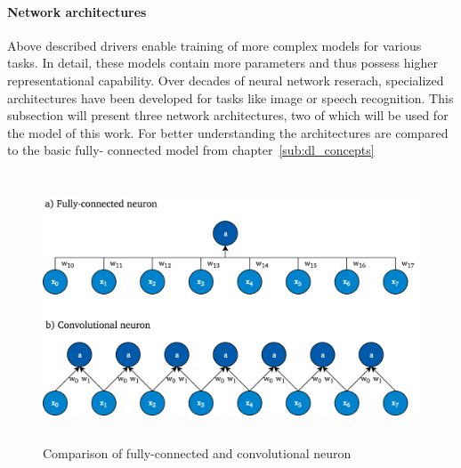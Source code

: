 \paragraph{Network architectures}
\label{sub:dl_architectures}

Above described drivers enable training of more complex models for various
tasks.
In detail, these models contain more parameters and thus possess higher
representational capability.
Over decades of neural network reserach, specialized architectures have been
developed for tasks like image or speech recognition.
This subsection will present three network architectures, two of which will
be used for the model of this work.
For better understanding the architectures are compared to the basic fully-
connected model from chapter~\ref{sub:dl_concepts}

\begin{figure}[h]
  \includegraphics[height=8cm]{img/conv_layer.png}
  \caption{Comparison of fully-connected and convolutional neuron}
\label{fig:conv_layer}
\end{figure}

